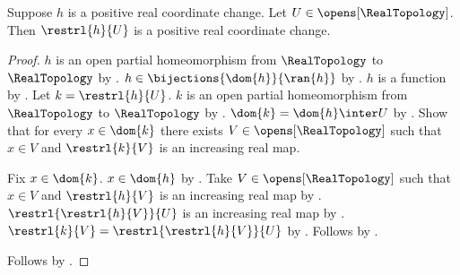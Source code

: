 \begin{theorem}\label{positive_real_change_restriction}
    Suppose $h$ is a positive real coordinate change.
    Let $U\in\opens[\RealTopology]$.
    Then $\restrl{h}{U}$ is a positive real coordinate change.
\end{theorem}
\begin{proof}
    $h$ is an open partial homeomorphism from $\RealTopology$ to $\RealTopology$
        by .
    $h\in\bijections{\dom{h}}{\ran{h}}$ by
        .
    $h$ is a function by .
    Let $k=\restrl{h}{U}$.
    $k$ is an open partial homeomorphism from $\RealTopology$ to $\RealTopology$ by
        .
    $\dom{k}=\dom{h}\inter U$ by .
    Show that for every $x\in\dom{k}$ there exists $V\in\opens[\RealTopology]$
        such that $x\in V$ and $\restrl{k}{V}$ is an increasing real map.
    \begin{subproof}
        Fix $x\in\dom{k}$.
        $x\in\dom{h}$ by .
        Take $V\in\opens[\RealTopology]$ such that $x\in V$ and
            $\restrl{h}{V}$ is an increasing real map by .
        $\restrl{\restrl{h}{V}}{U}$ is an increasing real map by
            .
        $\restrl{k}{V}=\restrl{\restrl{h}{V}}{U}$ by
            .
        Follows by \auto.
    \end{subproof}
    Follows by .
\end{proof}


